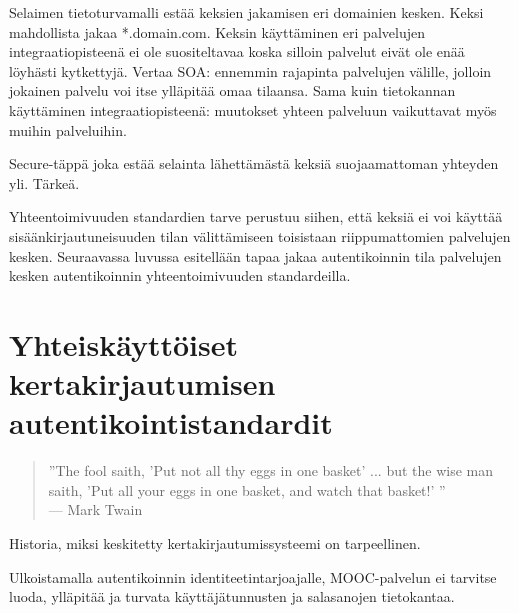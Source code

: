 \documentclass[finnish,gradu]{tktltiki}
\begin{document}
Selaimen tietoturvamalli estää keksien jakamisen eri domainien kesken. Keksi mahdollista jakaa *.domain.com. Keksin käyttäminen eri palvelujen integraatiopisteenä ei ole suositeltavaa koska silloin palvelut eivät ole enää löyhästi kytkettyjä. Vertaa SOA: ennemmin rajapinta palvelujen välille, jolloin jokainen palvelu voi itse ylläpitää omaa tilaansa. Sama kuin tietokannan käyttäminen integraatiopisteenä: muutokset yhteen palveluun vaikuttavat myös muihin palveluihin.

Secure-täppä joka estää selainta lähettämästä keksiä suojaamattoman yhteyden yli. Tärkeä.

Yhteentoimivuuden standardien tarve perustuu siihen, että keksiä ei voi käyttää sisäänkirjautuneisuuden tilan välittämiseen toisistaan riippumattomien palvelujen kesken. Seuraavassa luvussa esitellään tapaa jakaa autentikoinnin tila palvelujen kesken autentikoinnin yhteentoimivuuden standardeilla.




\section{Yhteiskäyttöiset kertakirjautumisen autentikointistandardit} %
\label{sec:Kertakirjautumisstandardit}
  \begin{quote}
      ''The fool saith, 'Put not all thy eggs in one basket' ...
      but the wise man saith, 'Put all your eggs in one basket, and watch that basket!' ''
      \\--- Mark Twain~\cite{twain_eggs_1894}
  \end{quote}

  Historia, miksi keskitetty kertakirjautumissysteemi on tarpeellinen.

  Ulkoistamalla autentikoinnin identiteetintarjoajalle, MOOC-palvelun ei tarvitse luoda, ylläpitää ja turvata käyttäjätunnusten ja salasanojen tietokantaa.
\end{document}
